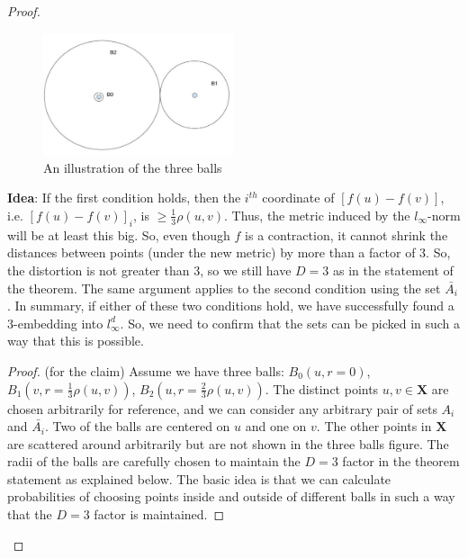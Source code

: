 \begin{proof}
\begin{figure}[h!]
\begin{center}
\caption{An illustration of the three balls}
\includegraphics[width=0.5\textwidth]{chapter_5/files/three_balls.jpg}
\end{center}
\end{figure}
\textbf{Idea}: If the first condition holds, then the $i^{th}$ 
coordinate
of $[f(u)-f(v)]$, i.e. 
$[f(u)-f(v)]_i$,
is $\geq \frac{1}{3} \rho (u,v)$.
Thus, the metric induced by the
$l_\infty$-norm will be at least this big.
So, even though $f$ is a contraction, it cannot shrink
the distances between points (under the new metric) by more
than a factor of 3. So, the distortion is not greater than 3, 
so we still have $D=3$ as in the statement of the theorem.
The same argument applies
to the second condition using the set $\bar{A_i}$.
In summary, if either of these two conditions hold, we have 
successfully found a 3-embedding into $l_\infty ^d$. 
So, we need to confirm that the sets can be picked in such a way 
that this is possible.

\begin{proof} (for the claim)
Assume we have three balls: $B_0(u,r=0)$, $B_1(v,r=\frac{1}{3}\rho
(u,v))$, $B_2(u,r=\frac{2}{3}\rho (u,v))$.
The distinct points $u,v \in \mathbf{X} $ are chosen 
arbitrarily for reference, and we can consider any 
arbitrary pair of sets $A_i$ and $\bar{A_i}$. 
Two of
the balls are centered on $u$ and one on $v$. The 
other points in $\mathbf{X}$ are scattered around 
arbitrarily but are not shown in the three balls 
figure. The radii of the balls are carefully chosen 
to maintain the $D=3$ factor in the theorem statement 
as explained below. The basic idea is that we can 
calculate probabilities of choosing points inside 
and outside of different balls in such a way that 
the $D=3$ factor is maintained.



\end{proof}
\end{proof}
